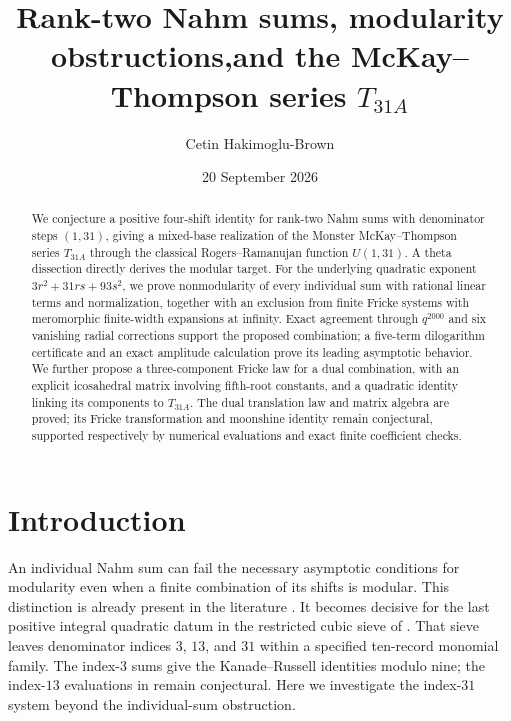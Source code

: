 \documentclass[11pt,reqno]{amsart}
\title[Rank-two Nahm sums and the series $T_{31A}$]
{Rank-two Nahm sums, modularity obstructions,\break and the McKay--Thompson series $T_{31A}$}
\author{Cetin Hakimoglu-Brown}
\date{20 September 2026}
\theoremstyle{remark}
\numberwithin{equation}{section}
\begin{document}
\begin{abstract}
We conjecture a positive four-shift identity for rank-two Nahm sums
with denominator steps $(1,31)$, giving a mixed-base realization of
the Monster McKay--Thompson series $T_{31A}$ through the classical
Rogers--Ramanujan function $U(1,31)$. A theta dissection directly
derives the modular target. For the underlying quadratic exponent
$3r^2+31rs+93s^2$, we prove nonmodularity of every individual sum
with rational linear terms and normalization, together with an
exclusion from finite Fricke systems with meromorphic finite-width
expansions at infinity. Exact agreement through $q^{2000}$ and six
vanishing radial corrections support the proposed combination;
a five-term dilogarithm certificate and an exact amplitude calculation
prove its leading asymptotic behavior. We further propose a
three-component Fricke law for a dual combination, with an explicit
icosahedral matrix involving fifth-root constants, and a quadratic
identity linking its components to $T_{31A}$. The dual translation
law and matrix algebra are proved; its Fricke transformation and
moonshine identity remain conjectural, supported respectively by
numerical evaluations and exact finite coefficient checks.
\end{abstract}
\maketitle

\section{Introduction}
An individual Nahm sum can fail the necessary asymptotic conditions for
modularity even when a finite combination of its shifts is modular.
This distinction is already present in the literature
\cite{AVH,Storzer}. It becomes decisive for the last positive integral
quadratic datum in the restricted cubic sieve of \cite{Brown}.
That sieve leaves denominator indices $3$, $13$, and $31$ within a
specified ten-record monomial family. The index-$3$ sums give the
Kanade--Russell identities modulo nine; the index-$13$ evaluations in
\cite{Brown} remain conjectural. Here we investigate the index-$31$
system beyond the individual-sum obstruction.
\end{document}
